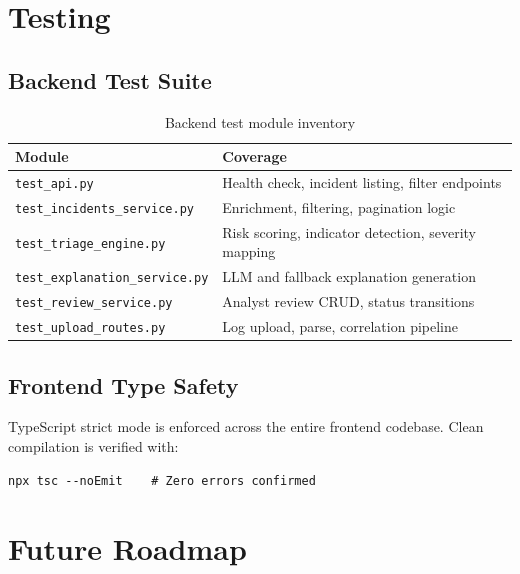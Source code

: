 \documentclass[12pt,a4paper]{article}
\begin{document}
\section{Testing}

\subsection{Backend Test Suite}

\begin{table}[H]
\centering
\caption{Backend test module inventory}
\begin{tabular}{lp{9cm}}
\toprule
\textbf{Module} & \textbf{Coverage} \\
\midrule
\texttt{test\_api.py}                  & Health check, incident listing, filter endpoints \\
\texttt{test\_incidents\_service.py}   & Enrichment, filtering, pagination logic \\
\texttt{test\_triage\_engine.py}       & Risk scoring, indicator detection, severity mapping \\
\texttt{test\_explanation\_service.py} & LLM and fallback explanation generation \\
\texttt{test\_review\_service.py}      & Analyst review CRUD, status transitions \\
\texttt{test\_upload\_routes.py}       & Log upload, parse, correlation pipeline \\
\bottomrule
\end{tabular}
\end{table}

\subsection{Frontend Type Safety}

TypeScript strict mode is enforced across the entire frontend codebase. Clean compilation
is verified with:

\begin{lstlisting}[style=tsstyle, caption=TypeScript compilation verification]
npx tsc --noEmit    # Zero errors confirmed
\end{lstlisting}

\section{Future Roadmap}
\end{document}
